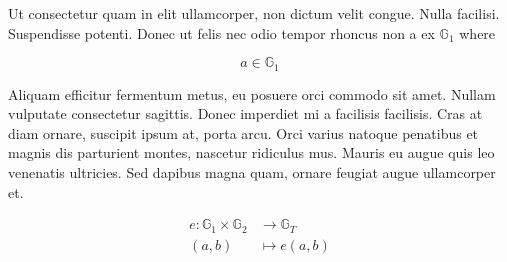 	
Ut consectetur quam in elit ullamcorper, non dictum velit congue. Nulla facilisi. Suspendisse potenti. Donec ut felis nec odio tempor rhoncus non a ex $\mathbb{G}_1$ where 

$$a \in \mathbb{G}_1$$

Aliquam efficitur fermentum metus, eu posuere orci commodo sit amet. Nullam vulputate consectetur sagittis. Donec imperdiet mi a facilisis facilisis. Cras at diam ornare, suscipit ipsum at, porta arcu. Orci varius natoque penatibus et magnis dis parturient montes, nascetur ridiculus mus. Mauris eu augue quis leo venenatis ultricies. Sed dapibus magna quam, ornare feugiat augue ullamcorper et.

\begin{align}
	e : \mathbb{G}_1 \times \mathbb{G}_2 & \rightarrow \mathbb{G}_T \\
	(a, b)                               & \mapsto e(a, b)          
\end{align}